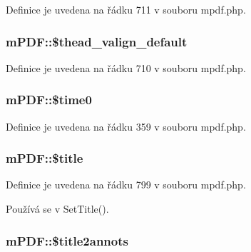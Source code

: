 Definice je uvedena na řádku 711 v souboru mpdf.\-php.

\hypertarget{classm_p_d_f_ae0b93c4a3d049f581421f2a102054fed}{
\subsubsection[{\$thead\-\_\-valign\-\_\-default}]{\setlength{\rightskip}{0pt plus 5cm}m\-P\-D\-F\-::\$thead\-\_\-valign\-\_\-default}}\label{classm_p_d_f_ae0b93c4a3d049f581421f2a102054fed}


Definice je uvedena na řádku 710 v souboru mpdf.\-php.

\hypertarget{classm_p_d_f_a6ba462ae9a2f7efe516165d0939d1784}{
\subsubsection[{\$time0}]{\setlength{\rightskip}{0pt plus 5cm}m\-P\-D\-F\-::\$time0}}\label{classm_p_d_f_a6ba462ae9a2f7efe516165d0939d1784}


Definice je uvedena na řádku 359 v souboru mpdf.\-php.

\hypertarget{classm_p_d_f_ab93ef24a50b81977a88194562c525612}{
\subsubsection[{\$title}]{\setlength{\rightskip}{0pt plus 5cm}m\-P\-D\-F\-::\$title}}\label{classm_p_d_f_ab93ef24a50b81977a88194562c525612}


Definice je uvedena na řádku 799 v souboru mpdf.\-php.



Používá se v Set\-Title().

\hypertarget{classm_p_d_f_a172a3adc2b2e47098dc674bffd91baab}{
\subsubsection[{\$title2annots}]{\setlength{\rightskip}{0pt plus 5cm}m\-P\-D\-F\-::\$title2annots}}\label{classm_p_d_f_a172a3adc2b2e47098dc674bffd91baab}


